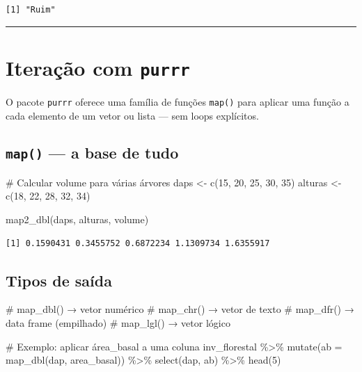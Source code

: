 \documentclass[
  letterpaper,
]{scrbook}
\newenvironment{Shaded}{\begin{snugshade}}{\end{snugshade}}
\newcommand{\AttributeTok}[1]{\textcolor[rgb]{0.40,0.45,0.13}{#1}}
\newcommand{\CommentTok}[1]{\textcolor[rgb]{0.37,0.37,0.37}{#1}}
\newcommand{\DecValTok}[1]{\textcolor[rgb]{0.68,0.00,0.00}{#1}}
\newcommand{\FunctionTok}[1]{\textcolor[rgb]{0.28,0.35,0.67}{#1}}
\newcommand{\NormalTok}[1]{\textcolor[rgb]{0.00,0.23,0.31}{#1}}
\newcommand{\OtherTok}[1]{\textcolor[rgb]{0.00,0.23,0.31}{#1}}
\newcommand{\SpecialCharTok}[1]{\textcolor[rgb]{0.37,0.37,0.37}{#1}}
\begin{document}
\begin{verbatim}
[1] "Ruim"
\end{verbatim}

\begin{center}\rule{0.5\linewidth}{0.5pt}\end{center}

\section{\texorpdfstring{Iteração com
\texttt{purrr}}{Iteração com purrr}}\label{iterauxe7uxe3o-com-purrr}

O pacote \texttt{purrr} oferece uma família de funções \texttt{map()}
para aplicar uma função a cada elemento de um vetor ou lista --- sem
loops explícitos.

\subsection{\texorpdfstring{\texttt{map()} --- a base de
tudo}{map() --- a base de tudo}}\label{map-a-base-de-tudo}

\begin{Shaded}
\begin{Highlighting}[]
\CommentTok{\# Calcular volume para várias árvores}
\NormalTok{daps }\OtherTok{\textless{}{-}} \FunctionTok{c}\NormalTok{(}\DecValTok{15}\NormalTok{, }\DecValTok{20}\NormalTok{, }\DecValTok{25}\NormalTok{, }\DecValTok{30}\NormalTok{, }\DecValTok{35}\NormalTok{)}
\NormalTok{alturas }\OtherTok{\textless{}{-}} \FunctionTok{c}\NormalTok{(}\DecValTok{18}\NormalTok{, }\DecValTok{22}\NormalTok{, }\DecValTok{28}\NormalTok{, }\DecValTok{32}\NormalTok{, }\DecValTok{34}\NormalTok{)}

\FunctionTok{map2\_dbl}\NormalTok{(daps, alturas, volume)}
\end{Highlighting}
\end{Shaded}

\begin{verbatim}
[1] 0.1590431 0.3455752 0.6872234 1.1309734 1.6355917
\end{verbatim}

\subsection{Tipos de saída}\label{tipos-de-sauxedda}

\begin{Shaded}
\begin{Highlighting}[]
\CommentTok{\# map\_dbl() → vetor numérico}
\CommentTok{\# map\_chr() → vetor de texto}
\CommentTok{\# map\_dfr() → data frame (empilhado)}
\CommentTok{\# map\_lgl() → vetor lógico}

\CommentTok{\# Exemplo: aplicar área\_basal a uma coluna}
\NormalTok{inv\_florestal }\SpecialCharTok{\%\textgreater{}\%} 
  \FunctionTok{mutate}\NormalTok{(}\AttributeTok{ab =} \FunctionTok{map\_dbl}\NormalTok{(dap, area\_basal)) }\SpecialCharTok{\%\textgreater{}\%} 
  \FunctionTok{select}\NormalTok{(dap, ab) }\SpecialCharTok{\%\textgreater{}\%} 
  \FunctionTok{head}\NormalTok{(}\DecValTok{5}\NormalTok{)}
\end{Highlighting}
\end{Shaded}
\end{document}
